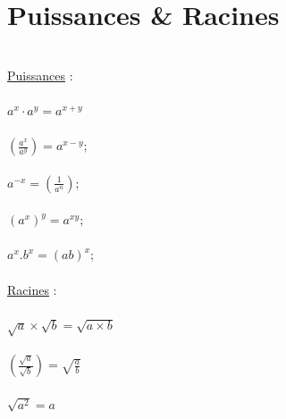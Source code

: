 \documentclass[a4paper,8pt,openany]{book}
\begin{document}
\section{Puissances \& Racines}
\\
\underline{Puissances} :\\
\\
$a^x\cdot a^y=a^{x+y}$\\
\\
$\left( \frac{a^x}{a^y} \right)=a^{x-y};$\\
\\
$a^{-x}=\left( \frac{1}{a^n} \right) ;$\\
\\
$(a^x)^y=a^{xy};$\\
\\
$a^x.b^x=(ab)^x;$\\
\\
\underline{Racines} :\\
\\
$\sqrt{a}\times \sqrt{b}=\sqrt{a\times b}$ \\
\\
$ \left( \frac{\sqrt{a}}{\sqrt{b}} \right) =\sqrt{\frac{a}{b}}$ \\
\\
$\sqrt{a^2}=a $ \\
\end{document}
